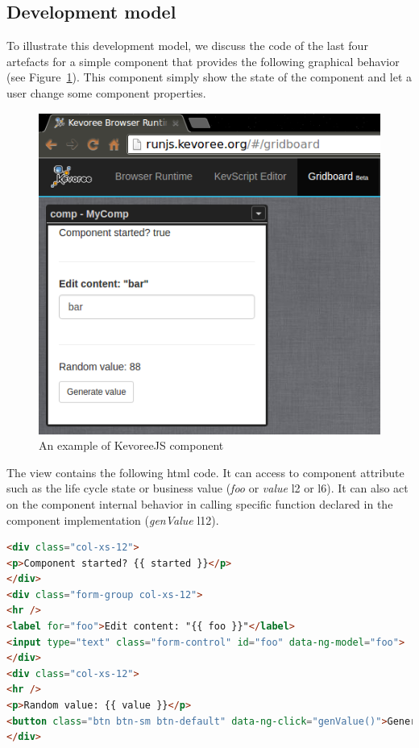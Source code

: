 \subsection{Development model}
To illustrate this development model, we discuss the code of the last four artefacts for a simple component that provides the following graphical behavior (see Figure~\ref{fig:fig5}). This component simply show the state of the component and let a user change some component properties. 


\begin{figure}[h]
	\centering
	\includegraphics[width=0.8\linewidth]{figures/fig5}
	\caption{An example of KevoreeJS component}
	\label{fig:fig5}
\end{figure}

The view contains the following html code. It can access to component attribute such as the life cycle state or business value (\emph{foo} or \emph{value} l2 or l6). It can also act on the component internal behavior in calling specific function declared in the component implementation (\emph{genValue} l12).

\begin{lstlisting}[language=HTML,numbers=right,firstnumber=last,frame=none,caption={Excerpt of the component view}]
<div class="col-xs-12">
<p>Component started? {{ started }}</p>
</div>
<div class="form-group col-xs-12">
<hr />
<label for="foo">Edit content: "{{ foo }}"</label>
<input type="text" class="form-control" id="foo" data-ng-model="foo">
</div>
<div class="col-xs-12">
<hr />
<p>Random value: {{ value }}</p>
<button class="btn btn-sm btn-default" data-ng-click="genValue()">Generate value</button>
</div>
\end{lstlisting}


